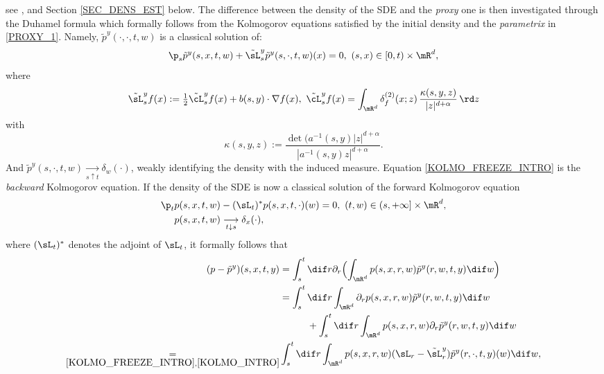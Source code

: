 {see \eg \cite{Be}, \cite{Bo-Ja} and Section \ref{SEC_DENS_EST} below. The difference between the density of the SDE and the \textit{proxy} one is then investigated through the Duhamel formula which formally follows from the Kolmogorov equations satisfied by the initial density and the \textit{parametrix} in \eqref{PROXY_1}. Namely, $\tilde p^y(\cdot,\cdot,t,w) $ is a classical solution of:
\begin{equation}\label{KOLMO_FREEZE_INTRO}
\p_s \tilde p^{y}(s,x,t,w)+{\tilde \sL}^{y}_s{\tilde p}^{y}(s,\cdot,t,w)(x)=0,\ (s,x)\in [0,t)\times \mR^d,
\end{equation}
where
\[
\tilde \sL^{y}_{s} f(x):=\tfrac 12\tilde \cL^{y}_{s} f(x)+b(s, y)\cdot\nabla f(x),\
\tilde \cL^{y}_{s} f(x)=\int_{\mR^d}\delta^{(2)}_f(x;z)\,\frac{\kappa(s,y,z)}{|z|^{d+\alpha}}\,\rd z
\]
with
\[
\kappa(s,y,z):=\frac{\det(a^{-1}(s,y)|z|^{d+\alpha}}{|a^{-1}(s,y)z|^{d+\alpha}}.
\]
And $\tilde p^{y}(s,\cdot,t,w) \underset{s\uparrow t}{\longrightarrow} \delta_w(\cdot)$, weakly identifying the density with the induced measure. Equation \eqref{KOLMO_FREEZE_INTRO} is the \textit{backward} Kolmogorov equation. If the density of the SDE is now a classical solution of the forward Kolmogorov equation
\begin{equation}
\begin{aligned}\label{KOLMO_INTRO}
\p_t p(s,x,t,w)&-({\sL}_t)^*p(s,x,t,\cdot)(w)=0,\ (t,w)\in (s,+\infty]\times \mR^d,\\
p(s,x,t,w) &\underset{t\downarrow s}{\longrightarrow} \delta_x(\cdot),
\end{aligned}
\end{equation}
where $({\sL}_t)^* $ denotes the adjoint of ${\sL}_t $,
it formally follows that
\begin{equation}
\begin{aligned}
(p-\tilde p^y)(s,x,t,y)&=\int_s^t \dif r \partial_r\Bigl(\int_{\mR^d}p(s,x,r,w) \tilde p^y(r,w,t,y) \dif w\Bigr)\\
&=\int_s^t \dif r \int_{\mR^d} \partial_r p(s,x,r,w) \tilde p^y(r,w,t,y) \dif w\\
&\hspace*{1cm}+\int_s^t \dif r \int_{\mR^d} p(s,x,r,w) \partial_r\tilde p^y(r,w,t,y) \dif w\\
\underset{\eqref{KOLMO_FREEZE_INTRO}, \eqref{KOLMO_INTRO}}{=}
&\int_s^t \dif r \int_{\mR^d} p(s,x,r,w)({\sL}_r-\tilde {\sL}_r^y)\tilde p^y (r,\cdot,t,y)(w)\dif w,
\label{PARAM_INTRO}
\end{aligned}
\end{equation}
}
